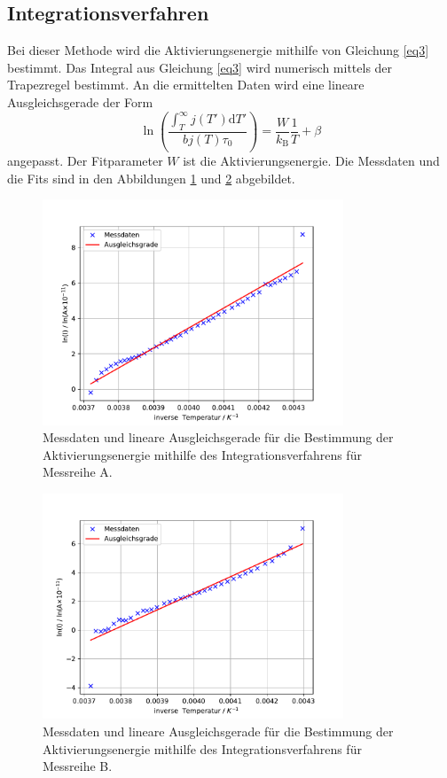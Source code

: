 \subsection{Integrationsverfahren}
Bei dieser Methode wird die Aktivierungsenergie mithilfe von Gleichung \eqref{eq3}  bestimmt.
Das Integral aus Gleichung \eqref{eq3} wird numerisch mittels der Trapezregel bestimmt.
An die ermittelten Daten wird eine lineare Ausgleichsgerade der Form 
\begin{equation*}
    \ln{ \left( \frac{ \int_{T}^\infty j(T') \mathrm{d}T' }{ b j(T) \tau_{\text{0}} } \right) } = \frac{W}{k_{\text{{B}}}} \frac{1}{T} +\beta
\end{equation*}
angepasst. Der Fitparameter $W$ ist die Aktivierungsenergie.
Die Messdaten und die Fits sind in den Abbildungen \ref{fig:Integralverfahren_A} und \ref{fig:Integralverfahren_B} abgebildet.
\FloatBarrier
\begin{figure}
    \centering
    \includegraphics[width= 0.8\textwidth,keepaspectratio]{figure/Integralverfahren_A.pdf}
    \caption{Messdaten und lineare Ausgleichsgerade für die Bestimmung der Aktivierungsenergie mithilfe des Integrationsverfahrens für Messreihe A.}
    \label{fig:Integralverfahren_A}
\end{figure}
\begin{figure}
    \centering
    \includegraphics[width= 0.8\textwidth,keepaspectratio]{figure/Integralverfahren_B.pdf}
    \caption{Messdaten und lineare Ausgleichsgerade für die Bestimmung der Aktivierungsenergie mithilfe des Integrationsverfahrens für Messreihe B.}
    \label{fig:Integralverfahren_B}
\end{figure}
